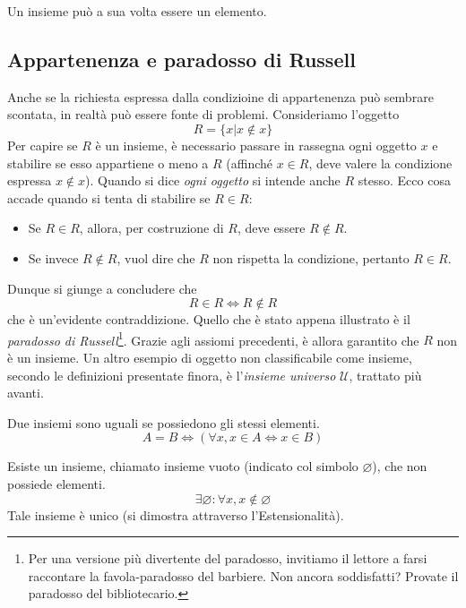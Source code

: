 \documentclass[oneside]{book}
\begin{document}
\begin{osservaz}
Un insieme può a sua volta essere un elemento.
\end{osservaz}

\subsection*{Appartenenza e paradosso di Russell}
Anche se la richiesta espressa dalla condizioine di appartenenza può sembrare
scontata, in realtà può essere fonte di problemi. Consideriamo l'oggetto
\[ R = \{x|x\not\in x\} \]
Per capire se $R$ è un insieme, è necessario passare in rassegna ogni oggetto
$x$ e stabilire se esso appartiene o meno a $R$ (affinché $x\in R$, deve valere
la condizione espressa $x\not\in x$). Quando si dice \textit{ogni oggetto} si
intende anche $R$ stesso. Ecco cosa accade quando si tenta di stabilire se
$R\in R$:
\begin{itemize}
\item Se $R\in R$, allora, per costruzione di $R$, deve essere $R\not\in R$.
\item Se invece $R\not\in R$, vuol dire che $R$ non rispetta la condizione, pertanto $R\in R$.
\end{itemize}
Dunque si giunge a concludere che \[ R\in R \Longleftrightarrow R\not\in R \]
che è un'evidente contraddizione. Quello che è stato appena illustrato è il \textit{paradosso
di Russell}\footnote{Per una versione più divertente del paradosso, invitiamo il
lettore a farsi raccontare la favola-paradosso del barbiere. Non ancora soddisfatti? Provate il paradosso del bibliotecario.}. Grazie agli assiomi precedenti, è allora garantito che $R$ non è
un insieme. Un altro esempio di oggetto non classificabile come insieme,
secondo le definizioni presentate finora, è l'\textit{insieme universo} $\mathcal{U}$,
trattato più avanti.

\begin{tcolorbox}[colback=yellow!30, colframe=yellow!30!black, title={Assioma di Estensionalità}]
Due insiemi sono uguali se possiedono gli stessi elementi.
\[ A = B \Longleftrightarrow (\forall x,x\in A \Leftrightarrow x \in B) \]
\end{tcolorbox}

\begin{tcolorbox}[colback=yellow!30, colframe=yellow!30!black, title=Esistenza dell'insieme vuoto]
Esiste un insieme, chiamato insieme vuoto (indicato col simbolo $\varnothing$), che non possiede elementi.
\[\exists \varnothing:\forall x, x\not\in\varnothing\]
Tale insieme è unico (si dimostra attraverso l'Estensionalità).
\end{tcolorbox}
\end{document}
